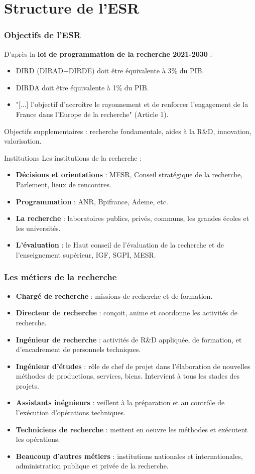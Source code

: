 \documentclass[xcolor=dvipsnames]{beamer}
\begin{document}
	\section{Structure de l'ESR}
	\begin{frame}
		\frametitle{Objectifs de l'ESR}
		D'après la \textbf{loi de programmation de la recherche 2021-2030} :
		\begin{itemize}
			\item DIRD (DIRAD+DIRDE) doit être équivalente à 3\% du PIB.
			\item DIRDA doit être équivalente à 1\% du PIB.
			\item "[...] l'objectif d'accroître le rayonnement et de renforcer l'engagement de la France dans l'Europe de la recherche" (Article 1).
		\end{itemize}
		Objectifs supplementaires : recherche fondamentale, aides à la R\&D, innovation, valorisation.
	\end{frame}
	\begin{frame}{Institutions}
		Les institutions de la recherche :
		\begin{itemize}
			\item \textbf{Décisions et orientations} : MESR, Conseil stratégique de la recherche, Parlement, lieux de rencontres.
			\item \textbf{Programmation} : ANR, Bpifrance, Ademe, etc.
			\item \textbf{La recherche} : laboratoires publics, privés, communs, les grandes écoles et les universités.
			\item \textbf{L'évaluation} : le Haut conseil de l'évaluation de la recherche et de l'enseignement supérieur, IGF, SGPI, MESR.
		\end{itemize}
	\end{frame}
	\begin{frame}
		\frametitle{Les métiers de la recherche}
		\small
		\begin{multicols}{2}
			\begin{itemize}
				\item \textbf{Chargé de recherche} : missions de recherche et de formation.
				\item \textbf{Directeur de recherche} : conçoit, anime et coordonne les activités de recherche.
				\item \textbf{Ingénieur de recherche} : activités de R\&D appliquée, de formation, et d'encadrement de personnels techniques.
				\item \textbf{Ingénieur d'études} : rôle de chef de projet dans l'élaboration de nouvelles méthodes de productions, services, biens. Intervient à tous les stades des projets.
				\item \textbf{Assistants inégnieurs} : veillent à la préparation et au contrôle de l'exécution d'opérations techniques.
				\item \textbf{Techniciens de recherche} : mettent en oeuvre les méthodes et exécutent les opérations.
				\item \textbf{Beaucoup d'autres métiers} : institutions nationales et internationales, administration publique et privée de la recherche.
			\end{itemize}
			\normalsize
		\end{multicols}
	\end{frame}
\end{document}
